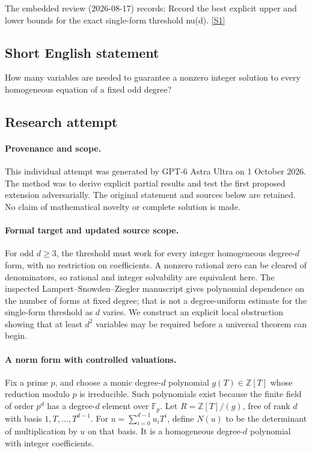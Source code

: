 \documentclass[11pt,a4paper]{article}
\newcommand{\Z}{\mathbb{Z}}
\newcommand{\F}{\mathbb{F}}
\newcommand{\sref}[2]{\hyperlink{source:#1:#2}{[S#2]}}
\begin{document}
The embedded review (2026-08-17) records: Record the best explicit upper and lower bounds for the exact single-form threshold nu(d). \sref{statement}{1}

\subsection{Short English statement}

How many variables are needed to guarantee a nonzero integer solution to every homogeneous equation of a fixed odd degree?

\subsection{Research attempt}

\paragraph{Provenance and scope.}
This individual attempt was generated by GPT-6 Astra Ultra on 1 October 2026. The method was to derive explicit partial results and test the first proposed extension adversarially. The original statement and sources below are retained. No claim of mathematical novelty or complete solution is made.

\paragraph{Formal target and updated source scope.}
For odd $d\geq3$, the threshold must work for every integer homogeneous degree-$d$ form, with no restriction on coefficients. A nonzero rational zero can be cleared of denominators, so rational and integer solvability are equivalent here. The inspected Lampert--Snowden--Ziegler manuscript gives polynomial dependence on the number of forms at fixed degree; that is not a degree-uniform estimate for the single-form threshold as $d$ varies. We construct an explicit local obstruction showing that at least $d^2$ variables may be required before a universal theorem can begin.

\paragraph{A norm form with controlled valuations.}
Fix a prime $p$, and choose a monic degree-$d$ polynomial $g(T)\in\Z[T]$ whose reduction modulo $p$ is irreducible. Such polynomials exist because the finite field of order $p^d$ has a degree-$d$ element over $\F_p$. Let $R=\Z[T]/(g)$, free of rank $d$ with basis $1,T,\ldots,T^{d-1}$. For $u=\sum_{i=0}^{d-1}u_iT^i$, define $N(u)$ to be the determinant of multiplication by $u$ on that basis. It is a homogeneous degree-$d$ polynomial with integer coefficients.
\end{document}
